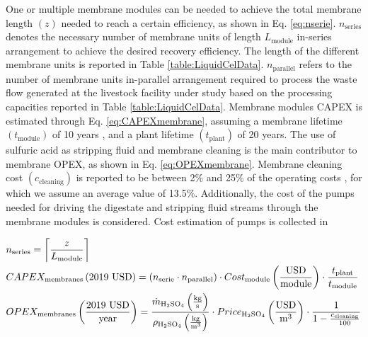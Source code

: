 \begin{refsection}[referencesCh6]

One or multiple membrane modules can be needed to achieve the total membrane length $\left( z \right)$ needed to reach a certain efficiency, as shown in Eq. \ref{eq:nserie}. $n_{\text{series}}$ denotes the necessary number of membrane units of length $L_{\text{module}}$ in-series arrangement to achieve the desired recovery efficiency. The length of the different membrane units is reported in Table \ref{table:LiquidCelData}. $n_{\text{parallel}}$ refers to the number of membrane units in-parallel arrangement required to process the waste flow generated at the livestock facility under study based on the processing capacities reported in Table \ref{table:LiquidCelData}. Membrane modules CAPEX is estimated through Eq. \ref{eq:CAPEXmembrane}, assuming a membrane lifetime $\left(t_{\text{module}}\right)$ of 10 years \citep{verrecht2010cost}, and a plant lifetime $\left(t_{\text{plant}}\right)$ of 20 years. The use of sulfuric acid as stripping fluid and membrane cleaning is the main contributor to membrane OPEX, as shown in Eq. \ref{eq:OPEXmembrane}. Membrane cleaning cost $\left(c_{\text{cleaning}}\right)$ is reported to be between 2\% and 25\% of the operating costs \citep{yu2020performance, verrecht2010cost}, for which we assume an average value of 13.5\%. 
Additionally, the cost of the pumps needed for driving the digestate and stripping fluid streams through the membrane modules is considered. Cost estimation of pumps is collected in {}

\begin{align}
	& n_{\text{series}} = \ceil*{\frac{z}{L_{\text{module}}}} \label{eq:nserie}
	\\
	& CAPEX_{\text{membranes}} \left(\text{2019 USD}\right)= \left(n_{\text{serie}} \cdot n_{\text{parallel}}\right) \cdot Cost_{\text{module}} \left(\frac{\text{USD}}{\text{module}}\right) \cdot \frac{t_{\text{plant}}}{t_{\text{module}}} \label{eq:CAPEXmembrane}
	\\
	& OPEX_{\text{membranes}} \left(\frac{\text{2019 USD}}{\text{year}}\right) = \frac{\dot{m}_{\text{H}_2 \text{SO}_4} \left(\frac{\text{kg}}{\text{s}}\right)}{\rho_{\text{H}_2 \text{SO}_4} \left(\frac{\text{kg}}{\text{m}^3}\right)} \cdot Price_{\text{H}_2 \text{SO}_4} \left(\frac{\text{USD}}{\text{m}^3}\right) \cdot \frac{1}{1-\frac{c_{\text{cleaning}}}{100}} \label{eq:OPEXmembrane}
\end{align}


\end{refsection}
